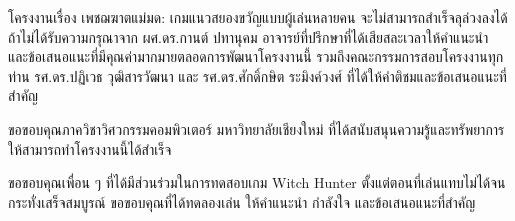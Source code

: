 \begin{acknowledgments}
โครงงานเรื่อง เพชฌฆาตแม่มด: เกมแนวสยองขวัญแบบผู้เล่นหลายคน จะไม่สามารถสำเร็จลุล่วงลงได้ ถ้าไม่ได้รับความกรุณาจาก ผศ.ดร.กานต์ ปทานุคม
อาจารย์ที่ปรึกษาที่ได้เสียสละเวลาให้คำแนะนำ และข้อเสนอแนะที่มีคุณค่ามากมายตลอดการพัฒนาโครงงานนี้ รวมถึงคณะกรรมการสอบโครงงานทุกท่าน รศ.ดร.ปฏิเวธ วุฒิสารวัฒนา
และ รศ.ดร.ศักดิ์กษิต ระมิงค์วงศ์​ ที่ได้ให้คำติชมและข้อเสนอแนะที่สำคัญ

ขอขอบคุณภาควิชาวิศวกรรมคอมพิวเตอร์ มหาวิทยาลัยเชียงใหม่ ที่ได้สนับสนุนความรู้และทรัพยาการให้สามารถทำโครงงานนี้ได้สำเร็จ

ขอขอบคุณเพื่อน ๆ ที่ได้มีส่วนร่วมในการทดสอบเกม Witch Hunter ตั้งแต่ตอนที่เล่นแทบไม่ได้จนกระทั่งเสร็จสมบูรณ์ ขอขอบคุณที่ได้ทดลองเล่น ให้คำแนะนำ กำลังใจ และข้อเสนอแนะที่สำคัญ

\end{acknowledgments}%
\fi %

\contentspage

\ifproject
\figurelistpage

\tablelistpage
\fi %



